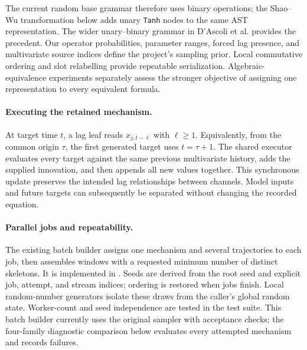 The current random base grammar therefore uses binary operations; the
Shao--Wu transformation below adds unary \texttt{Tanh} nodes to the same AST
representation. The wider unary--binary grammar in D'Ascoli et al.
provides the precedent. Our operator probabilities, parameter ranges, forced
lag presence, and multivariate source indices define the project's sampling
prior. Local commutative ordering and slot relabelling provide repeatable
serialization. Algebraic-equivalence experiments separately assess the
stronger objective of assigning one representation to every equivalent
formula.

\paragraph{Executing the retained mechanism.}
At target time $t$, a lag leaf reads $x_{j,t-\ell}$ with $\ell\geq1$.
Equivalently, from the common origin $\tau$, the first generated target uses
$t=\tau+1$. The shared executor
 evaluates every target against the
same previous multivariate history, adds the supplied innovation, and then
appends all new values together. This synchronous update preserves the
intended lag relationships between channels. Model inputs and future targets
can subsequently be separated without changing the recorded equation.

\paragraph{Parallel jobs and repeatability.}
The existing batch builder assigns one mechanism and several trajectories to
each job, then assembles windows with a requested minimum number of distinct
skeletons. It is implemented in
. Seeds are
derived from the root seed and explicit job, attempt, and stream indices;
ordering is restored when jobs finish. Local random-number generators isolate
these draws from the caller's global random state. Worker-count and seed
independence are tested in the test suite. This batch builder currently uses
the original sampler with acceptance checks; the four-family diagnostic
comparison below evaluates every attempted mechanism and records failures.

